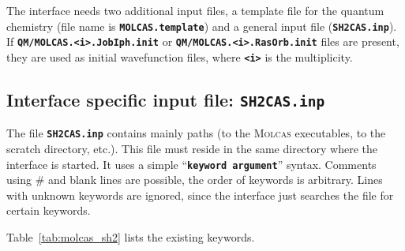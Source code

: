 \documentclass[a4paper,11pt,DIV=15,openany,twoside=false]{scrbook}
\newcommand{\sharc}{\textsc{Sharc}}
\newcommand{\ttt}[1]{\textbf{\texttt{#1}}}
\begin{document}

The interface needs two additional input files, a template file for the quantum chemistry (file name is \ttt{MOLCAS.template}) and a general input file (\ttt{SH2CAS.inp}). If \ttt{QM/MOLCAS.<i>.JobIph.init} or \ttt{QM/MOLCAS.<i>.RasOrb.init} files are present, they are used as initial wavefunction files, where \ttt{<i>} is the multiplicity. %

\subsection{Interface specific input file: \ttt{SH2CAS.inp}}

The file \ttt{SH2CAS.inp} contains mainly paths (to the \textsc{Molcas} executables, to the scratch directory, etc.). This file must reside in the same directory where the interface is started. It uses a simple ``\ttt{keyword argument}'' syntax. Comments using \# and blank lines are possible, the order of keywords is arbitrary. Lines with unknown keywords are ignored, since the interface just searches the file for certain keywords.

Table~\ref{tab:molcas_sh2} lists the existing keywords.
\end{document}
